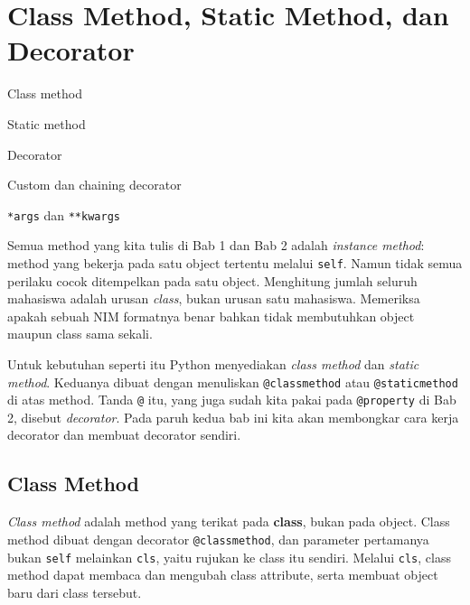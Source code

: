 \chapter{Class Method, Static Method, dan Decorator}

\begin{dibabini}
  \item Class method
  \item Static method
  \item Decorator
  \item Custom dan chaining decorator
  \item \texttt{*args} dan \texttt{**kwargs}
\end{dibabini}

Semua method yang kita tulis di Bab 1 dan Bab 2 adalah \emph{instance method}: method yang bekerja pada satu object tertentu melalui \texttt{self}. Namun tidak semua perilaku cocok ditempelkan pada satu object. Menghitung jumlah seluruh mahasiswa adalah urusan \emph{class}, bukan urusan satu mahasiswa. Memeriksa apakah sebuah NIM formatnya benar bahkan tidak membutuhkan object maupun class sama sekali.

Untuk kebutuhan seperti itu Python menyediakan \emph{class method} dan \emph{static method}. Keduanya dibuat dengan menuliskan \texttt{@classmethod} atau \texttt{@staticmethod} di atas method. Tanda \texttt{@} itu, yang juga sudah kita pakai pada \texttt{@property} di Bab 2, disebut \emph{decorator}. Pada paruh kedua bab ini kita akan membongkar cara kerja decorator dan membuat decorator sendiri.

\section{Class Method}

\emph{Class method} adalah method yang terikat pada \textbf{class}, bukan pada object. Class method dibuat dengan decorator \texttt{@classmethod}, dan parameter pertamanya bukan \texttt{self} melainkan \texttt{cls}, yaitu rujukan ke class itu sendiri. Melalui \texttt{cls}, class method dapat membaca dan mengubah class attribute, serta membuat object baru dari class tersebut.

